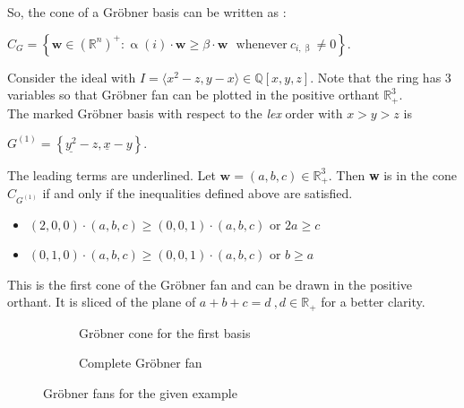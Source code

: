 So, the cone of a Gröbner basis can be written as : \cite{coxOshea}\\
\begin{center}
$C_{G} = \left\lbrace \textbf{w} \in \left(\mathbb{R}^{n}\right)^{+} : \upalpha\left( i\right) \cdot \textbf{w} \geq \beta \cdot \textbf{w}~~~ \textrm{whenever}~ c_{i,\upbeta} \neq 0 \right\rbrace   .$
\end{center}


\begin{env_example}\normalfont
\label{ex:groebnerfan}
Consider the ideal with $ I = \langle x^{2}-z,y-x \rangle \in \mathbb{Q}\left[ x,y,z\right] .$
Note that the ring has 3 variables so that Gröbner fan can be plotted in the positive orthant $ \mathbb{R}^{3}_{+}$. \\
The marked Gröbner basis with respect to the \textit{lex} order with $x>y>z$ is
\begin{center}
$G^{\left( 1\right) } = \left\lbrace \underline{y^{2}}-z,\underline{x} -y\right\rbrace .$
\end{center}
The leading terms are underlined. Let $\textbf{w} = \left( a,b,c\right) \in \mathbb{R}^{3}_{+} $. Then \textbf{w} is in the cone $C_{G^{(1)}}$ if and only if the inequalities defined above are satisfied.

\begin{itemize}

\item
$\left( 2,0,0\right) \cdot \left( a,b,c\right) \geq \left( 0,0,1\right) \cdot \left( a,b,c\right) $ or $2a\geq c$ 
\item
$\left( 0,1,0\right) \cdot \left( a,b,c\right) \geq \left( 0,0,1\right) \cdot \left( a,b,c\right) $ or $b\geq a$ 

\end{itemize} 

This is the first cone of the Gröbner fan and can be drawn in the positive orthant. It is sliced of the plane of $a+b+c=d~,d\in \mathbb{R}_+$ for a better clarity.


\begin{figure}
    \centering
    \begin{subfigure}[b]{0.48\linewidth}        %
        \centering
        
        \caption{Gröbner cone for the first basis}
        \label{fig:singlegroebner}
    \end{subfigure}
    \begin{subfigure}[b]{0.48\linewidth}        %
        \centering
        
        \caption{Complete Gröbner fan}
        \label{fig:completegroebner}
    \end{subfigure}
    \caption{Gröbner fans for the given example}
    \label{fig:groebnerfans}
\end{figure}





\end{env_example}
